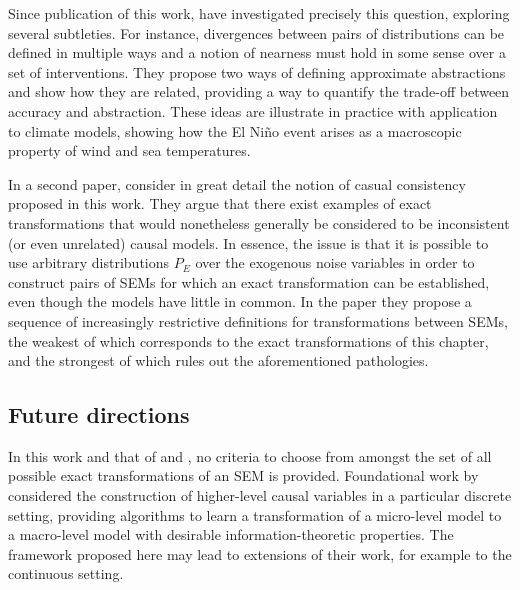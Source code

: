 Since publication of this work, \cite{beckers2019approximate} have investigated precisely this question, exploring several subtleties. 
For instance, divergences between pairs of distributions can be defined in multiple ways
and a notion of nearness must hold in some sense over a set of interventions. 
They propose two ways of defining approximate abstractions and show how they are related, providing a way to quantify the trade-off between accuracy and abstraction.
These ideas are illustrate in practice with application to climate models, showing how the El Ni\~no event arises as a macroscopic property of wind and sea temperatures.


In a second paper, \cite{beckers2019abstracting} consider in great detail the notion of casual consistency proposed in this work. 
They argue that there exist examples of exact transformations that would nonetheless generally be considered to be inconsistent (or even unrelated) causal models. 
In essence, the issue is that it is possible to use arbitrary distributions $P_E$ over the exogenous noise variables in order to construct pairs of SEMs for which an exact transformation can be established, even though the models have little in common.
In the paper they propose a sequence of increasingly restrictive definitions for transformations between SEMs, the weakest of which corresponds to the exact transformations of this chapter, and the strongest of which rules out the aforementioned pathologies.




\subsection{Future directions}

In this work and that of \cite{beckers2019approximate} and \cite{beckers2019abstracting},
no criteria to choose from amongst the set of all possible exact transformations of an SEM is provided.
Foundational work by \cite{chalupka2015visual,chalupka2016multi} considered the construction of higher-level causal variables in a particular discrete setting,
providing algorithms to learn a transformation of a micro-level model to a macro-level model with desirable information-theoretic properties.
The framework proposed here may lead to extensions of their work, for example to the continuous setting.

